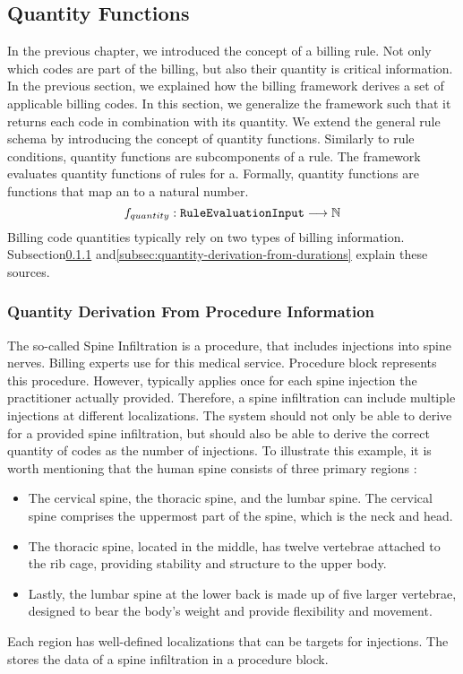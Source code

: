 \subsection{Quantity Functions}\label{subsec:quantity-functions}
In the previous chapter, we introduced the concept of a billing rule.
Not only which codes are part of the billing, but also their quantity is critical information.
In the previous section, we explained how the billing framework derives a set of applicable billing codes.
In this section, we generalize the framework such that it returns each code in combination with its quantity.
We extend the general rule schema by introducing the concept of quantity functions.
Similarly to rule conditions, quantity functions are subcomponents of a rule.
The framework evaluates quantity functions of rules for a.
Formally, quantity functions are functions that map an \REI to a natural number.
\begin{equation}
    \label{eq:quantity-function-natural}
    f_{quantity}: \texttt{RuleEvaluationInput} \longrightarrow \mathbb{N}
\end{equation}
Billing code quantities typically rely on two types of billing information.
Subsection\ref{subsubsec:quantity-derivation-from-procedure-information} and\ref{subsec:quantity-derivation-from-durations} explain these sources.

\subsubsection{Quantity Derivation From Procedure Information}\label{subsubsec:quantity-derivation-from-procedure-information}
The so-called Spine Infiltration is a procedure, that includes injections into spine nerves.
Billing experts use  for this medical service.
Procedure block  represents this procedure.
However,  typically applies once for each spine injection the practitioner actually provided.
Therefore, a spine infiltration can include multiple injections at different localizations.
The system should not only be able to derive  for a provided spine infiltration, but should also be able to derive the correct quantity of  codes as the number of injections.
To illustrate this example, it is worth mentioning that the human spine consists of three primary regions \cite{BOGDUK2016675}:
\begin{itemize}
    \item The cervical spine, the thoracic spine, and the lumbar spine.
    The cervical spine comprises the uppermost part of the spine, which is the neck and head.
    \item The thoracic spine, located in the middle, has twelve vertebrae attached to the rib cage, providing stability and structure to the upper body.
    \item Lastly, the lumbar spine at the lower back is made up of five larger vertebrae, designed to bear the body's weight and provide flexibility and movement.
\end{itemize}
Each region has well-defined localizations that can be targets for injections.
The \AVS stores the data of a spine infiltration in a  procedure block.

